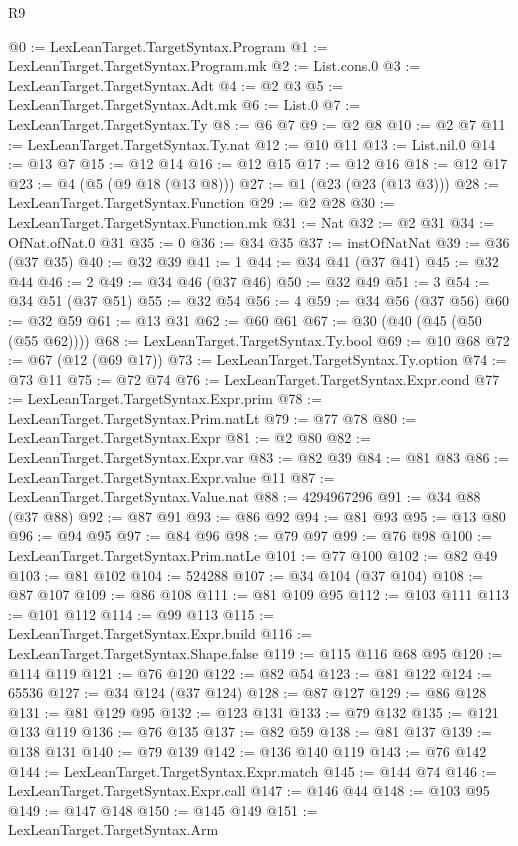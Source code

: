 \begin{lexlean}{R9}
\begin{coremodule}
@0 := LexLeanTarget.TargetSyntax.Program
@1 := LexLeanTarget.TargetSyntax.Program.mk
@2 := List.cons.{0}
@3 := LexLeanTarget.TargetSyntax.Adt
@4 := @2 @3
@5 := LexLeanTarget.TargetSyntax.Adt.mk
@6 := List.{0}
@7 := LexLeanTarget.TargetSyntax.Ty
@8 := @6 @7
@9 := @2 @8
@10 := @2 @7
@11 := LexLeanTarget.TargetSyntax.Ty.nat
@12 := @10 @11
@13 := List.nil.{0}
@14 := @13 @7
@15 := @12 @14
@16 := @12 @15
@17 := @12 @16
@18 := @12 @17
@23 := @4 (@5 (@9 @18 (@13 @8)))
@27 := @1 (@23 (@23 (@13 @3)))
@28 := LexLeanTarget.TargetSyntax.Function
@29 := @2 @28
@30 := LexLeanTarget.TargetSyntax.Function.mk
@31 := Nat
@32 := @2 @31
@34 := OfNat.ofNat.{0} @31
@35 := 0
@36 := @34 @35
@37 := instOfNatNat
@39 := @36 (@37 @35)
@40 := @32 @39
@41 := 1
@44 := @34 @41 (@37 @41)
@45 := @32 @44
@46 := 2
@49 := @34 @46 (@37 @46)
@50 := @32 @49
@51 := 3
@54 := @34 @51 (@37 @51)
@55 := @32 @54
@56 := 4
@59 := @34 @56 (@37 @56)
@60 := @32 @59
@61 := @13 @31
@62 := @60 @61
@67 := @30 (@40 (@45 (@50 (@55 @62))))
@68 := LexLeanTarget.TargetSyntax.Ty.bool
@69 := @10 @68
@72 := @67 (@12 (@69 @17))
@73 := LexLeanTarget.TargetSyntax.Ty.option
@74 := @73 @11
@75 := @72 @74
@76 := LexLeanTarget.TargetSyntax.Expr.cond
@77 := LexLeanTarget.TargetSyntax.Expr.prim
@78 := LexLeanTarget.TargetSyntax.Prim.natLt
@79 := @77 @78
@80 := LexLeanTarget.TargetSyntax.Expr
@81 := @2 @80
@82 := LexLeanTarget.TargetSyntax.Expr.var
@83 := @82 @39
@84 := @81 @83
@86 := LexLeanTarget.TargetSyntax.Expr.value @11
@87 := LexLeanTarget.TargetSyntax.Value.nat
@88 := 4294967296
@91 := @34 @88 (@37 @88)
@92 := @87 @91
@93 := @86 @92
@94 := @81 @93
@95 := @13 @80
@96 := @94 @95
@97 := @84 @96
@98 := @79 @97
@99 := @76 @98
@100 := LexLeanTarget.TargetSyntax.Prim.natLe
@101 := @77 @100
@102 := @82 @49
@103 := @81 @102
@104 := 524288
@107 := @34 @104 (@37 @104)
@108 := @87 @107
@109 := @86 @108
@111 := @81 @109 @95
@112 := @103 @111
@113 := @101 @112
@114 := @99 @113
@115 := LexLeanTarget.TargetSyntax.Expr.build
@116 := LexLeanTarget.TargetSyntax.Shape.false
@119 := @115 @116 @68 @95
@120 := @114 @119
@121 := @76 @120
@122 := @82 @54
@123 := @81 @122
@124 := 65536
@127 := @34 @124 (@37 @124)
@128 := @87 @127
@129 := @86 @128
@131 := @81 @129 @95
@132 := @123 @131
@133 := @79 @132
@135 := @121 @133 @119
@136 := @76 @135
@137 := @82 @59
@138 := @81 @137
@139 := @138 @131
@140 := @79 @139
@142 := @136 @140 @119
@143 := @76 @142
@144 := LexLeanTarget.TargetSyntax.Expr.match
@145 := @144 @74
@146 := LexLeanTarget.TargetSyntax.Expr.call
@147 := @146 @44
@148 := @103 @95
@149 := @147 @148
@150 := @145 @149
@151 := LexLeanTarget.TargetSyntax.Arm

\end{coremodule}
\end{lexlean}

